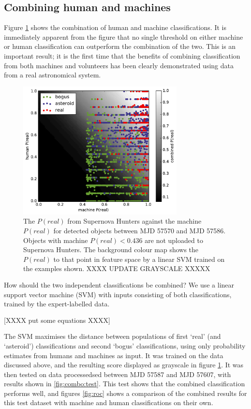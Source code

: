 \documentclass[a4paper,fleqn,usenatbib]{mnras}
\begin{document}
\subsection{Combining human and machines} 

Figure \ref{fig:combo_train} shows the combination of human and machine classifications. It is immediately apparent from the figure that no single threshold on either machine or human classification can outperform the combination of the two. This is an important result; it is the first time that the benefits of combining classification from both machines and volunteers has been clearly demonstrated using data from a real astronomical system. 

\begin{figure}
   \includegraphics[width=84mm]{figs/human_v_machine_train.pdf}
   \caption{The $P(real)$ from Supernova Hunters against the machine $P(real)$ for detected 
            objects between MJD 57570 and MJD 57586.  Objects with machine $P(real) < 0.436$ are
            not uploaded to Supernova Hunters.  The background colour map shows 
            the $P(real)$ to that point in feature space by a linear SVM trained on the 
            examples shown. XXXX UPDATE GRAYSCALE XXXXX}
   \label{fig:combo_train} 
\end{figure}

How should the two independent classifications be combined? We use a linear support vector machine (SVM) with inputs consisting of both classifications, trained by the expert-labelled data. 

[XXXX put some equations XXXX]

The SVM  maximises the distance between populations of first `real' (and `asteroid') classifications and second `bogus' classifications, using only probability estimates from humans and machines as input. It was trained on the data discussed above, and the resulting score displayed as grayscale in figure \ref{fig:combo_train}. It was then tested on data processedsed between MJD 57587 and MJD 57607, with results shown in \ref{fig:combo:test}. This test shows that the combined classification performs well, and figures \ref{fig:roc} shows a comparison of the combined results for this test dataset with machine and human classifications on their own.
\end{document}
